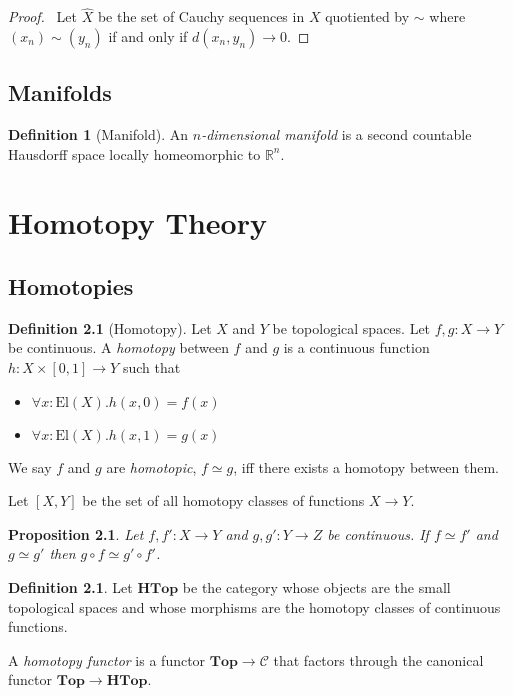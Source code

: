 \documentclass{book}
\let\qed\relax
\newtheorem{prop}[ax]{Proposition}
\theoremstyle{definition}
\newtheorem{df}[ax]{Definition}
\newcommand{\El}[1]{\ensuremath{\mathrm{El} \left( {#1} \right)}}
\newcommand{\Top}{\ensuremath{\mathbf{Top}}}
\begin{document}
\begin{proof}
\pf\ Let $\hat{X}$ be the set of Cauchy sequences in $X$ quotiented by $\sim$ where $(x_n) \sim (y_n)$ if and only if $d(x_n, y_n) \rightarrow 0$. \qed
\end{proof}

\section{Manifolds}

\begin{df}[Manifold]
An \emph{$n$-dimensional manifold} is a second countable Hausdorff space locally homeomorphic to $\mathbb{R}^n$.
\end{df}

\chapter{Homotopy Theory}

\section{Homotopies}

\begin{df}[Homotopy]
Let $X$ and $Y$ be topological spaces. Let $f,g : X \rightarrow Y$ be continuous. A \emph{homotopy} between $f$ and $g$ is a continuous function $h : X \times [0,1] \rightarrow Y$ such that
\begin{itemize}
\item $\forall x : \El{X}. h(x,0) = f(x)$
\item $\forall x : \El{X}. h(x,1) = g(x)$
\end{itemize}
We say $f$ and $g$ are \emph{homotopic}, $f \simeq g$, iff there exists a homotopy between them.

Let $[X,Y]$ be the set of all homotopy classes of functions $X \rightarrow Y$.
\end{df}

\begin{prop}
Let $f,f' : X \rightarrow Y$ and $g,g' : Y \rightarrow Z$ be continuous. If $f \simeq f'$ and $g \simeq g'$ then $g \circ f \simeq g' \circ f'$.
\end{prop}

\begin{df}
Let $\mathbf{HTop}$ be the category whose objects are the small topological spaces and whose morphisms are the homotopy classes of continuous functions.

A \emph{homotopy functor} is a functor $\Top \rightarrow \mathcal{C}$ that factors through the canonical functor $\Top \rightarrow \mathbf{HTop}$.
\end{df}
\end{document}
